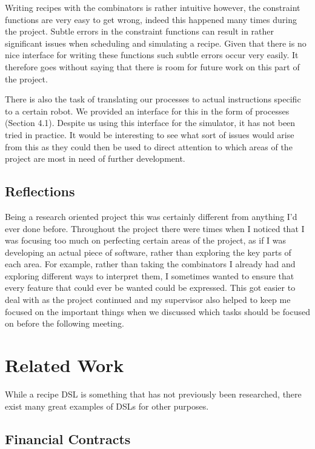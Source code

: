 \documentclass[11pt]{article}
\begin{document}
\medbreak

Writing recipes with the combinators is rather intuitive however, the constraint functions
are very easy to get wrong, indeed this happened many times during the project. Subtle
errors in the constraint functions can result in rather significant issues when scheduling
and simulating a recipe. Given that there is no nice interface for writing these functions
such subtle errors occur very easily. It therefore goes without saying that there is room
for future work on this part of the project.

\medbreak

There is also the task of translating our processes to actual instructions specific to a certain
robot. We provided an interface for this in the form of processes (Section 4.1). Despite us using
this interface for the simulator, it has not been tried in practice. It would be interesting to
see what sort of issues would arise from this as they could then be used to direct attention to
which areas of the project are most in need of further development.

\subsection{Reflections}

Being a research oriented project this was certainly different from anything I'd ever done before.
Throughout the project there were times when I noticed that I was focusing too much on perfecting
certain areas of the project, as if I was developing an actual piece of software, rather than
exploring the key parts of each area. For example, rather than taking the combinators I already
had and exploring different ways to interpret them, I sometimes wanted to ensure that every feature
that could ever be wanted could be expressed. This got easier to deal with as the project
continued and my supervisor also helped to keep me focused on the important things when we discussed
which tasks should be focused on before the following meeting.

\section{Related Work}

While a recipe DSL is something that has not previously been researched, there exist many
great examples of DSLs for other purposes.

\subsection{Financial Contracts}
\end{document}
